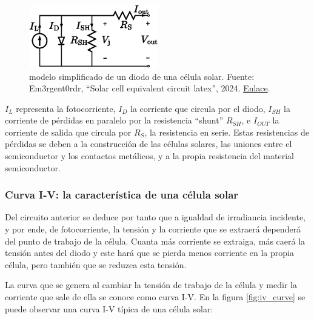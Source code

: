 \begin{figure}[H]
      \centering
      \includegraphics[width=0.5\textwidth]{./images/SoA_irrad/Solar_cell_equivalent_circuit_latex.png}
      \caption{\Gls{modelo} simplificado de un \gls{diodo} de una \gls{célula solar}. Fuente: Em3rgent0rdr, ``Solar cell equivalent circuit latex'', 2024. \href{https://commons.wikimedia.org/w/index.php?curid=149538519}{Enlace}.}
      \label{fig:solar_cell_model}
\end{figure}

$I_L$ representa la fotocorriente, $I_D$ la corriente que circula por el \gls{diodo}, $I_{SH}$ la corriente de pérdidas en paralelo por la resistencia ``\gls{shunt}'' $R_{SH}$, e $I_{OUT}$ la corriente de salida que circula por $R_{S}$, la resistencia en serie. Estas resistencias de pérdidas se deben a la construcción de las células solares, las uniones entre el \gls{semiconductor} y los contactos metálicos, y a la propia resistencia del material \gls{semiconductor}.

\subsubsection{Curva I-V: la característica de una célula solar}

Del circuito anterior se deduce por tanto que a igualdad de \gls{irradiancia} incidente, y por ende, de fotocorriente, la tensión y la corriente que se extraerá dependerá del punto de trabajo de la célula. Cuanta más corriente se extraiga, más caerá la tensión antes del \gls{diodo} y este hará que se pierda menos corriente en la propia célula, pero también que se reduzca esta tensión.

La curva que se genera al cambiar la tensión de trabajo de la célula y medir la corriente que sale de ella se conoce como \gls{curva I-V}. En la figura \ref{fig:iv_curve} se puede observar una curva I-V típica de una célula solar:


